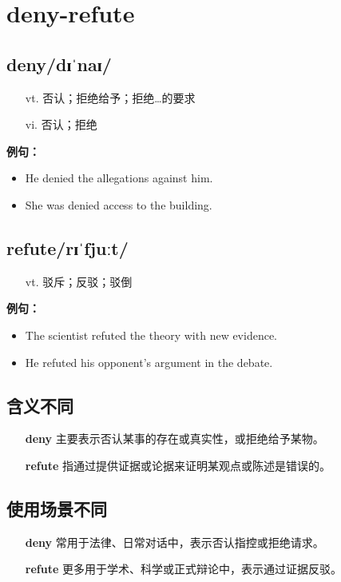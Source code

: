 \documentclass[12pt]{article}
\begin{document}
\section*{deny-refute}
\begin{multicols}{2}
\subsection*{\textbf{deny}\quad/dɪˈnaɪ/}
\begin{itemize}[leftmargin=2em]
\item[vt.] 否认；拒绝给予；拒绝…的要求
\item[vi.] 否认；拒绝
\end{itemize}
\textbf{例句：}
\begin{itemize}[leftmargin=2em]
\item He denied the allegations against him.
\item She was denied access to the building.
\end{itemize}
\subsection*{\textbf{refute}\quad/rɪˈfjuːt/}
\begin{itemize}[leftmargin=2em]
\item[vt.] 驳斥；反驳；驳倒
\end{itemize}
\textbf{例句：}
\begin{itemize}[leftmargin=2em]
\item The scientist refuted the theory with new evidence.
\item He refuted his opponent's argument in the debate.
\end{itemize}
\end{multicols}
\subsection*{含义不同}
\begin{itemize}
\item[\textbf{deny}] 主要表示否认某事的存在或真实性，或拒绝给予某物。
\item[\textbf{refute}] 指通过提供证据或论据来证明某观点或陈述是错误的。
\end{itemize}
\subsection*{使用场景不同}
\begin{itemize}
\item[\textbf{deny}] 常用于法律、日常对话中，表示否认指控或拒绝请求。
\item[\textbf{refute}] 更多用于学术、科学或正式辩论中，表示通过证据反驳。
\end{itemize}
\end{document}
